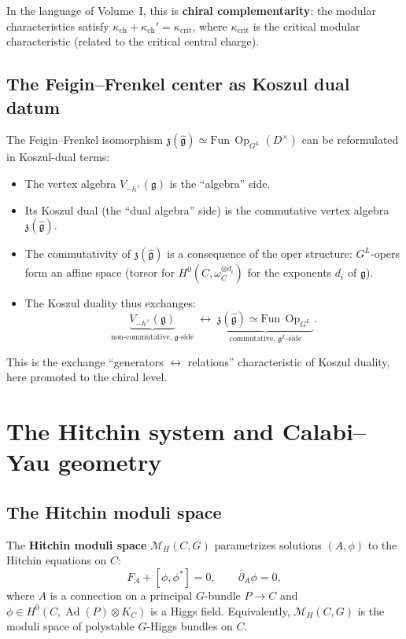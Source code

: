 \documentclass[11pt]{article}
\theoremstyle{definition}
\theoremstyle{remark}
\DeclareMathOperator{\Ad}{Ad}
\DeclareMathOperator{\Op}{Op}
\newcommand{\g}{\mathfrak{g}}
\newcommand{\gL}{\mathfrak{g}^L}
\newcommand{\hv}{h^\vee}
\begin{document}
In the language of Volume~I, this is \textbf{chiral complementarity}: the
modular characteristics satisfy $\kappa_{\mathrm{ch}} + \kappa_{\mathrm{ch}}' = \kappa_{\mathrm{crit}}$,
where $\kappa_{\mathrm{crit}}$ is the critical modular characteristic
(related to the critical central charge).

\subsection{The Feigin--Frenkel center as Koszul dual datum}

The Feigin--Frenkel isomorphism $\mathfrak{z}(\hat{\g}) \simeq
\mathrm{Fun}\,\Op_{G^L}(D^\times)$ can be reformulated in Koszul-dual terms:

\begin{itemize}
 \item The vertex algebra $V_{-\hv}(\g)$ is the ``algebra'' side.
 \item Its Koszul dual (the ``dual algebra'' side) is the commutative vertex
 algebra $\mathfrak{z}(\hat{\g})$.
 \item The commutativity of $\mathfrak{z}(\hat{\g})$ is a consequence of
 the oper structure: $G^L$-opers form an affine space (torsor for
 $H^0(C, \omega_C^{\otimes d_i})$ for the exponents $d_i$ of $\g$).
 \item The Koszul duality thus exchanges:
 \[
 \underbrace{V_{-\hv}(\g)}_{\text{non-commutative, $\g$-side}}
 \;\longleftrightarrow\;
 \underbrace{\mathfrak{z}(\hat{\g}) \simeq
 \mathrm{Fun}\,\Op_{G^L}}_{\text{commutative, $\gL$-side}}.
 \]
\end{itemize}

This is the exchange ``generators $\leftrightarrow$ relations''
characteristic of Koszul duality, here promoted to the chiral level.


\section{The Hitchin system and Calabi--Yau geometry}
\label{sec:hitchin}

\subsection{The Hitchin moduli space}

The \textbf{Hitchin moduli space} $\mathcal{M}_H(C,G)$ parametrizes solutions
$(A, \phi)$ to the Hitchin equations on $C$:
\[
 F_A + [\phi, \phi^*] = 0, \qquad
 \bar{\partial}_A \phi = 0,
\]
where $A$ is a connection on a principal $G$-bundle $P \to C$ and
$\phi \in H^0(C, \Ad(P) \otimes K_C)$ is a Higgs field. Equivalently,
$\mathcal{M}_H(C,G)$ is the moduli space of polystable $G$-Higgs bundles on
$C$.
\end{document}

